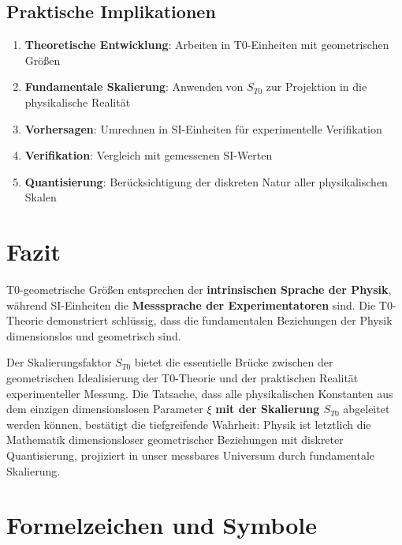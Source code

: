 	\subsection{Praktische Implikationen}
	\begin{enumerate}
		\item \textbf{Theoretische Entwicklung}: Arbeiten in T0-Einheiten mit geometrischen Größen
		\item \textbf{Fundamentale Skalierung}: Anwenden von $S_{T0}$ zur Projektion in die physikalische Realität
		\item \textbf{Vorhersagen}: Umrechnen in SI-Einheiten für experimentelle Verifikation
		\item \textbf{Verifikation}: Vergleich mit gemessenen SI-Werten
		\item \textbf{Quantisierung}: Berücksichtigung der diskreten Natur aller physikalischen Skalen
	\end{enumerate}
	
	\section{Fazit}
	
	T0-geometrische Größen entsprechen der \textbf{intrinsischen Sprache der Physik}, während SI-Einheiten die \textbf{Messsprache der Experimentatoren} sind. Die T0-Theorie demonstriert schlüssig, dass die fundamentalen Beziehungen der Physik dimensionslos und geometrisch sind.
	
	Der Skalierungsfaktor $S_{T0}$ bietet die essentielle Brücke zwischen der geometrischen Idealisierung der T0-Theorie und der praktischen Realität experimenteller Messung. Die Tatsache, dass alle physikalischen Konstanten aus dem einzigen dimensionslosen Parameter $\xi$ \textbf{mit der Skalierung $S_{T0}$} abgeleitet werden können, bestätigt die tiefgreifende Wahrheit: Physik ist letztlich die Mathematik dimensionsloser geometrischer Beziehungen mit diskreter Quantisierung, projiziert in unser messbares Universum durch fundamentale Skalierung.
	
	\appendix
	\section{Formelzeichen und Symbole}
	
